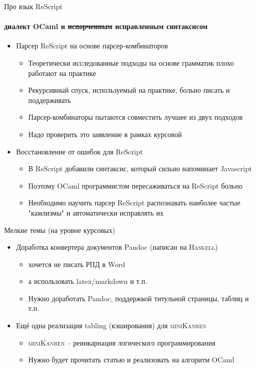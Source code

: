 \documentclass[aspectratio=169
  , xcolor={svgnames}
  , hyperref=
      { colorlinks
      , urlcolor=DarkBlue
      }  
  , 12pt
  , russian  %
  ]{beamer}
\begin{document}
\begin{frame}[fragile]{Про язык ReScript}
\framesubtitle{диалект OCaml и \sout{испорченным} исправленным синтаксисом}

\begin{itemize}
\item Парсер ReScript на основе парсер-комбинаторов
\href{http://kakadu.github.io/fp2020/projects.html#rescript-combinators}{\faGithub}
\begin{itemize}
\item Теоретически исследованные подходы на основе грамматик плохо работают на практике
\item Рекурсивный спуск, используемый на практике, больно писать и поддерживать
\item Парсер-комбинаторы пытаются совместить лучшее из двух подходов
\item Надо проверить это заявление в рамках курсовой
\end{itemize}\pause

\item Восстановление от ошибок для ReScript
\href{http://kakadu.github.io/fp2020/projects.html#rescript-recovery}{\faGithub}
\begin{itemize}
\item В ReScript добавили синтаксис, который сильно напоминает Javascript
\item Поэтому OCaml программистом пересаживаться на ReScript больно
\item Необходимо научить парсер ReScript распознавать наиболее частые "камлизмы" и автоматически исправлять их
\end{itemize}
\end{itemize}

\end{frame}



\begin{frame}[fragile]{Мелкие темы (на уровне курсовых) }
\begin{itemize}
\item Доработка конвертера документов Pandoc (написан на \textsc{Haskell})
\begin{itemize}
\item хочется не писать РПД в Word
\item а использовать latex/markdown и т.п.
\item Нужно доработать Pandoc, поддержкой титульной страницы, таблиц и т.п.
\end{itemize}\pause

\item Ещё одна реализация tabling (кэширования) для \textsc{miniKanren}
\begin{itemize}
\item \textsc{miniKanren} -- реинкарнация логического программирования
\item Нужно будет прочитать статью и реализовать на алгоритм OCaml
\end{itemize}
\end{itemize}

\end{frame}
\end{document}
